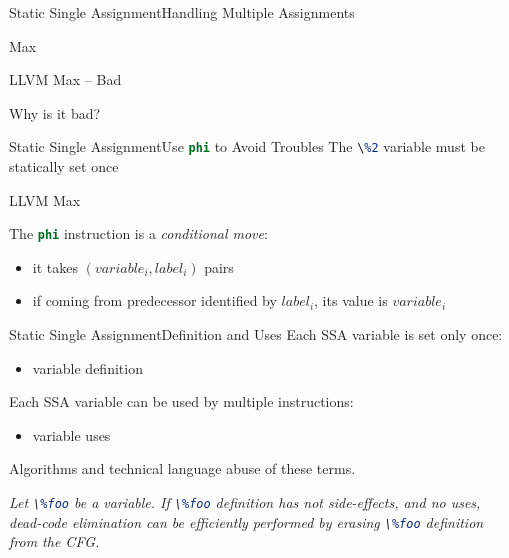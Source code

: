 \documentclass[10pt,mathserif]{beamer}
\newcommand{\cinput}[1]{}
\newcommand{\llvminput}[1]{}
\newcommand{\llvminline}[1]{\lstinline[language=LLVM]!#1!}
\begin{document}
\begin{frame}{Static Single Assignment}{Handling Multiple Assignments}
	\begin{block}{Max}
		\centering
		\cinput{snippet/02/max.c}
	\end{block}
	
	\begin{block}{LLVM Max -- Bad}
		\centering
		\llvminput{snippet/02/bad-max.ll}
	\end{block}
	
	Why is it bad?
\end{frame}

\begin{frame}{Static Single Assignment}{Use \llvminline{phi} to Avoid Troubles}
	The \llvminline{\%2} variable must be statically set once
	
	\begin{block}{LLVM Max}
		\centering
		\llvminput{snippet/02/good-max.ll}
	\end{block}
	
	The \llvminline{phi} instruction is a \emph{conditional move}:
	
	\begin{itemize}
		\item it takes $(variable_i, label_i)$ pairs
		\item if coming from predecessor identified by $label_i$, its value is $variable_i$
	\end{itemize}
\end{frame}

\begin{frame}{Static Single Assignment}{Definition and Uses}
	Each SSA variable is set only once:
	
	\begin{itemize}
		\item variable \alert{definition}
	\end{itemize}
	
	\vfill
	Each SSA variable can be used by multiple instructions:
	
	\begin{itemize}
		\item variable \alert{uses}
	\end{itemize}
	
	\vfill
	Algorithms and technical language abuse of these terms.
	
	\vfill
	\emph{
		Let \llvminline{\%foo} be a variable. If \llvminline{\%foo} definition has not
		side-effects, and no uses, dead-code elimination can be efficiently performed
		by erasing \llvminline{\%foo} definition from the CFG.
	}
\end{frame}
\end{document}
